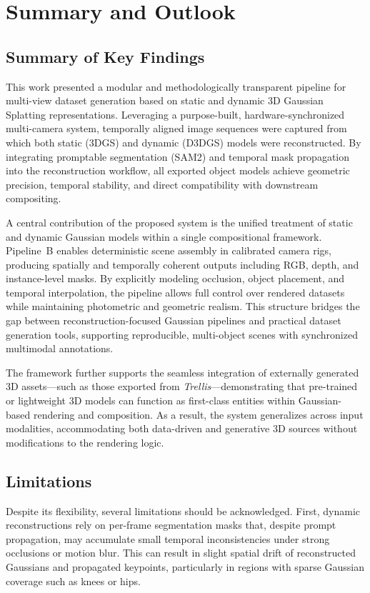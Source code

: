 \chapter{Summary and Outlook}

\section{Summary of Key Findings}

This work presented a modular and methodologically transparent pipeline for multi-view dataset generation based on static and dynamic 3D Gaussian Splatting representations.
Leveraging a purpose-built, hardware-synchronized multi-camera system, temporally aligned image sequences were captured from which both static (3DGS) and dynamic (D3DGS) models were reconstructed.
By integrating promptable segmentation (SAM2) and temporal mask propagation into the reconstruction workflow, all exported object models achieve geometric precision, temporal stability, and direct compatibility with downstream compositing.

A central contribution of the proposed system is the unified treatment of static and dynamic Gaussian models within a single compositional framework.
Pipeline~B enables deterministic scene assembly in calibrated camera rigs, producing spatially and temporally coherent outputs including RGB, depth, and instance-level masks.
By explicitly modeling occlusion, object placement, and temporal interpolation, the pipeline allows full control over rendered datasets while maintaining photometric and geometric realism.
This structure bridges the gap between reconstruction-focused Gaussian pipelines and practical dataset generation tools, supporting reproducible, multi-object scenes with synchronized multimodal annotations.

The framework further supports the seamless integration of externally generated 3D assets—such as those exported from \emph{Trellis}—demonstrating that pre-trained or lightweight 3D models can function as first-class entities within Gaussian-based rendering and composition.
As a result, the system generalizes across input modalities, accommodating both data-driven and generative 3D sources without modifications to the rendering logic.

\section{Limitations}

Despite its flexibility, several limitations should be acknowledged.
First, dynamic reconstructions rely on per-frame segmentation masks that, despite prompt propagation, may accumulate small temporal inconsistencies under strong occlusions or motion blur.
This can result in slight spatial drift of reconstructed Gaussians and propagated keypoints, particularly in regions with sparse Gaussian coverage such as knees or hips.

